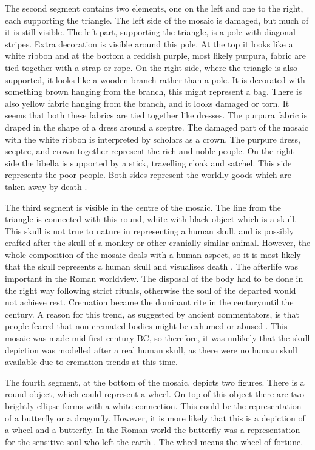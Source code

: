 	The second segment contains two elements, one on the left and one to the right, each supporting the triangle. The left side of the mosaic is damaged, but much of it is still visible. The left part, supporting the triangle, is a pole with diagonal stripes. Extra decoration is visible around this pole. At the top it looks like a white ribbon and at the bottom a reddish purple, most likely purpura, 
fabric are tied together with a strap or rope. On the right side, where the triangle is also supported, it looks like a wooden branch rather than a pole. It is decorated with something brown hanging from the branch, this might represent a bag. There is also yellow fabric hanging from the branch, and it looks damaged or torn. It seems that both these fabrics are tied together like dresses.
	The purpura fabric is draped in the shape of a dress around a sceptre. The damaged part of the mosaic with the white ribbon is interpreted by scholars as a crown. The purpure dress, sceptre, and crown together represent the rich and noble people. On the right side the libella is supported by a stick, travelling cloak and satchel. This side represents the poor people. Both sides represent the worldly goods which are taken away by death \parencites[99--100]{Cuomo_2007}[9]{Sogliano_1874}. 

	The third segment is visible in the centre of the mosaic. The line from the triangle is connected with this round, white with black object which is a skull. This skull is not true to nature in representing a human skull, and is possibly crafted after the skull of a monkey or other cranially-similar animal. However, the whole composition of the mosaic deals with a human aspect, so it is most likely that the skull represents a human skull and visualises death \parencite [99] {Cuomo_2007}. The afterlife was important in the Roman worldview. The disposal of the body had to be done in the right way following strict rituals, otherwise the soul of the departed would not achieve rest. Cremation became the dominant rite in the  century\BC until the  century\AD. 
A reason for this trend, as suggested by ancient commentators, is that people feared that non-cremated bodies might be exhumed or abused \parencite [80--82] {Hope_2009}. This mosaic was made mid-first century BC, so therefore, it was unlikely that the skull depiction was modelled after a real human skull, as there were no human skull available due to cremation trends at this time.
	
	The fourth segment, at the bottom of the mosaic, depicts two figures. There is a round object, which could represent a wheel. On top of this object there are two brightly ellipse forms with a white connection. This could be the representation of a butterfly or a dragonfly. However, it is more likely that this is a depiction of a wheel and a butterfly. In the Roman world the butterfly was a representation for the sensitive soul who left the earth \parencite [9] {Sogliano_1874}. The wheel means the wheel of fortune\parencite [99] {Cuomo_2007}.
	
